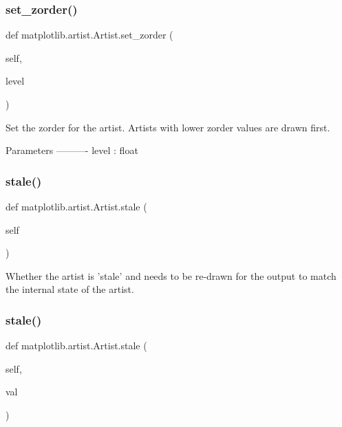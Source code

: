\subsubsection{\texorpdfstring{set\+\_\+zorder()}{set\_zorder()}}
{\footnotesize\ttfamily def matplotlib.\+artist.\+Artist.\+set\+\_\+zorder (\begin{DoxyParamCaption}\item[{}]{self,  }\item[{}]{level }\end{DoxyParamCaption})}

\begin{DoxyVerb}Set the zorder for the artist.  Artists with lower zorder
values are drawn first.

Parameters
----------
level : float
\end{DoxyVerb}
 \mbox{\label{classmatplotlib_1_1artist_1_1Artist_af914fd5701b9ee325e83386af4929483}} 
\subsubsection{\texorpdfstring{stale()}{stale()}\hspace{0.1cm}{\footnotesize\ttfamily [1/2]}}
{\footnotesize\ttfamily def matplotlib.\+artist.\+Artist.\+stale (\begin{DoxyParamCaption}\item[{}]{self }\end{DoxyParamCaption})}

\begin{DoxyVerb}Whether the artist is 'stale' and needs to be re-drawn for the output
to match the internal state of the artist.
\end{DoxyVerb}
 \mbox{\label{classmatplotlib_1_1artist_1_1Artist_ae5c12acde0393d4c115b39d736c96d88}} 
\subsubsection{\texorpdfstring{stale()}{stale()}\hspace{0.1cm}{\footnotesize\ttfamily [2/2]}}
{\footnotesize\ttfamily def matplotlib.\+artist.\+Artist.\+stale (\begin{DoxyParamCaption}\item[{}]{self,  }\item[{}]{val }\end{DoxyParamCaption})}

